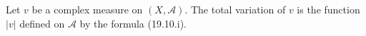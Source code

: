 Let $v$ be a complex measure on $(X, \mathcal{A})$. The total variation of $v$ is the function $|v|$ defined on $\mathcal{A}$ by the formula (19.10.i).
